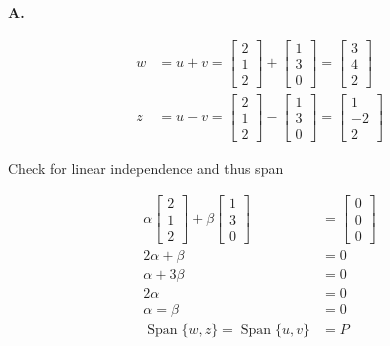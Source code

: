 \documentclass[main.tex]{subfiles}
\begin{document}
\begin{enumerate}
\begin{enumerate}
    \textbf{A.}
    
    $$
    \begin{aligned}
    w&=u+v=\left[\begin{array}{l}
    2 \\
    1 \\
    2
    \end{array}\right]+\left[\begin{array}{l}
    1 \\
    3 \\
    0
    \end{array}\right]=\left[\begin{array}{l}
    3 \\
    4 \\
    2
    \end{array}\right]\\
    z&=u-v=\left[\begin{array}{l}
    2 \\
    1 \\
    2
    \end{array}\right]-\left[\begin{array}{l}
    1 \\
    3 \\
    0
    \end{array}\right]=\left[\begin{array}{c}
    1 \\
    -2 \\
    2
    \end{array}\right]
    \end{aligned}
    $$
    
    Check for linear independence and thus span
    
    $$
    \begin{aligned}
    \alpha\left[\begin{array}{l}
    2 \\
    1 \\
    2
    \end{array}\right]+\beta\left[\begin{array}{l}
    1 \\
    3 \\
    0
    \end{array}\right]&=\left[\begin{array}{l}
    0 \\
    0 \\
    0
    \end{array}\right]\\
    2 \alpha + \beta &= 0 \\
    \alpha + 3 \beta &= 0 \\
    2 \alpha &=0\\
    \alpha = \beta &= 0\\
    \operatorname{Span}\{w, z\}=\operatorname{Span}\{u, v\} &= P
    \end{aligned}
    $$
    

\end{enumerate}
\end{enumerate}
\end{document}

